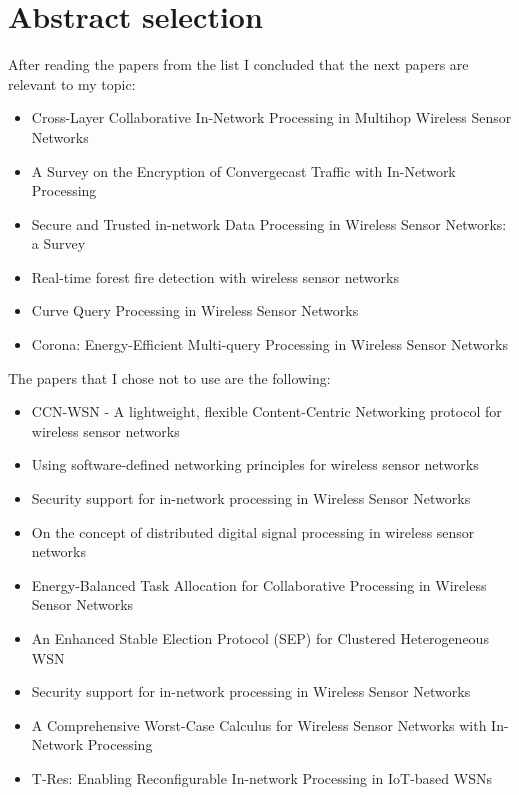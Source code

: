 \section{Abstract selection}

After reading the papers from the list I concluded that the next papers are relevant to my topic:

\begin{itemize}
    \item Cross-Layer Collaborative In-Network Processing in Multihop Wireless Sensor Networks
    \item A Survey on the Encryption of Convergecast Traffic with In-Network Processing
    \item Secure and Trusted in-network Data Processing in Wireless Sensor Networks: a Survey
    \item Real-time forest fire detection with wireless sensor networks
    \item Curve Query Processing in Wireless Sensor Networks
    \item Corona: Energy-Efficient Multi-query Processing in Wireless Sensor Networks
\end{itemize}

The papers that I chose not to use are the following:

\begin{itemize}
    \item CCN-WSN - A lightweight, flexible Content-Centric Networking protocol for wireless sensor networks
    \item Using software-defined networking principles for wireless sensor networks
    \item Security support for in-network processing in Wireless Sensor Networks
    \item On the concept of distributed digital signal processing in wireless sensor networks
    \item Energy-Balanced Task Allocation for Collaborative Processing in Wireless Sensor Networks
    \item An Enhanced Stable Election Protocol (SEP) for Clustered Heterogeneous WSN
    \item Security support for in-network processing in Wireless Sensor Networks
    \item A Comprehensive Worst-Case Calculus for Wireless Sensor Networks with In-Network Processing
    \item T-Res: Enabling Reconfigurable In-network Processing in IoT-based WSNs
\end{itemize}

